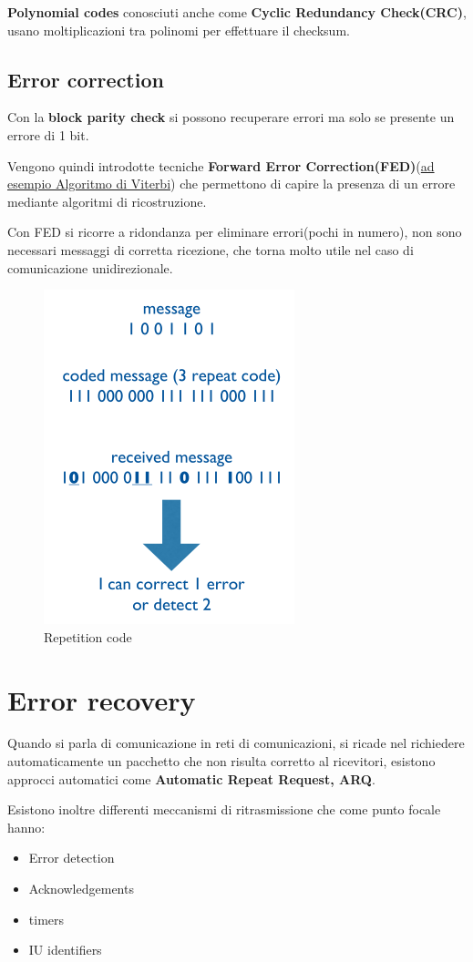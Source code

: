\textbf{Polynomial codes} conosciuti anche come \textbf{Cyclic Redundancy Check(CRC)},
usano moltiplicazioni tra polinomi per effettuare il checksum.

\subsection{Error correction}
Con la \textbf{block parity check} si possono recuperare errori ma solo se presente un errore di 1 bit.

Vengono quindi introdotte tecniche \textbf{Forward Error Correction(FED)}(\href{https://en.wikipedia.org/wiki/Viterbi_algorithm}{ad esempio Algoritmo di Viterbi})
che permettono di capire la presenza di un errore mediante algoritmi di ricostruzione.

Con FED si ricorre a ridondanza per eliminare errori(pochi in numero), non sono necessari messaggi
di corretta ricezione, che torna molto utile nel caso di comunicazione unidirezionale.


\begin{figure}[!ht]
	\centering
	\includegraphics[width=0.4\columnwidth]{./images/repetition_code.png}
	\caption{Repetition code}
	\label{fig_repetition_code}
\end{figure}

\section{Error recovery}

Quando si parla di comunicazione in reti di comunicazioni, si ricade nel richiedere automaticamente
un pacchetto che non risulta corretto al ricevitori,
esistono approcci automatici come \textbf{Automatic Repeat Request, ARQ}.

Esistono inoltre differenti meccanismi di ritrasmissione che come punto focale hanno:
\begin{itemize}
	\item Error detection
	\item Acknowledgements
	\item timers
	\item IU identifiers
\end{itemize}


